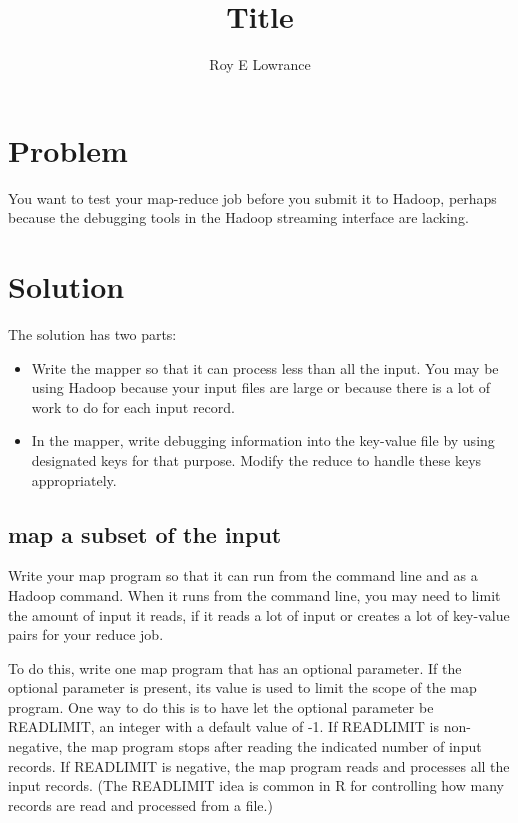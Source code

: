 \documentclass{article}
\begin{document}
\title{Title}
\author{Roy E Lowrance}
\maketitle


\section{Problem}

You want to test your map-reduce job before you submit it to Hadoop, perhaps because the 
debugging tools in the Hadoop streaming interface are lacking.

\section{Solution}

The solution has two parts:
\begin{itemize}
  \item Write the mapper so that it can process less than all the input.
    You may be using Hadoop because your input files are large or
    because there is a lot of work to do for each input record.
  \item In the mapper, write debugging information into the key-value
    file by using designated keys for that purpose. Modify the reduce to
    handle these keys appropriately.
\end{itemize}

\subsection{map a subset of the input}

Write your map program so that it can run from the command line and as a
Hadoop command. When it runs from the command line, you may need to
limit the amount of input it reads, if it reads a lot of input or
creates a lot of key-value pairs for your reduce job.

To do this, write one map program that has an optional parameter. If the
optional parameter is present, its value is used to limit the scope of
the map program. One way to do this is to have let the optional
parameter be READLIMIT, an integer with a default value of -1. If
READLIMIT is non-negative, the map program stops after reading the
indicated number of input records. If READLIMIT is negative, the map
program reads and processes all the input records. (The READLIMIT idea
is common in R for controlling how many records are read and processed
from a file.)
\end{document}
